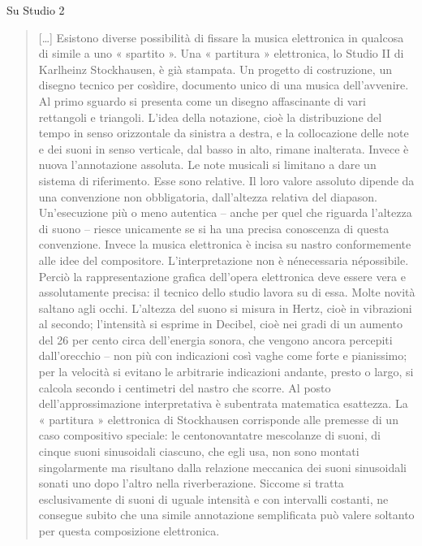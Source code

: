 Su Studio 2

\begin{quote}
	[\ldots] Esistono diverse possibilità di fissare la musica elettronica in qualcosa di simile a uno « spartito ». Una « partitura » elettronica, lo Studio II di Karlheinz Stockhausen, è già stampata. Un progetto di costruzione, un disegno tecnico per cosìdire, documento unico di una musica dell’avvenire. Al primo sguardo si presenta come un disegno affascinante di vari rettangoli e triangoli.
	L’idea della notazione, cioè la distribuzione del tempo in senso orizzontale da sinistra a destra, e la collocazione delle note e dei suoni in senso verticale, dal basso in alto, rimane inalterata. Invece è nuova l’annotazione assoluta. Le note musicali si limitano a dare un sistema di riferimento. Esse sono relative. Il loro valore assoluto dipende da una convenzione non obbligatoria, dall’altezza relativa del diapason. Un’esecuzione più o meno autentica – anche per quel che riguarda l’altezza di suono – riesce unicamente se si ha una precisa conoscenza di questa convenzione. Invece la musica elettronica è incisa su nastro conformemente alle idee del compositore. L’interpretazione non è nénecessaria népossibile. Perciò la rappresentazione grafica dell’opera elettronica deve essere vera e assolutamente precisa: il tecnico dello studio lavora su di essa. Molte novità saltano agli occhi. L’altezza del suono si misura in Hertz, cioè in vibrazioni al secondo; l’intensità si esprime in Decibel, cioè nei gradi di un aumento del 26 per cento circa dell’energia sonora, che vengono ancora percepiti dall’orecchio – non più con indicazioni così vaghe come forte e pianissimo; per la velocità si evitano le arbitrarie indicazioni andante, presto o largo, si calcola secondo i centimetri del nastro che scorre. Al posto dell’approssimazione interpretativa è subentrata matematica esattezza. La « partitura » elettronica di Stockhausen corrisponde alle premesse di un caso compositivo speciale: le centonovantatre mescolanze di suoni, di cinque suoni sinusoidali ciascuno, che egli usa, non sono montati singolarmente ma risultano dalla relazione meccanica dei suoni sinusoidali sonati uno dopo l’altro nella riverberazione. Siccome si tratta esclusivamente di suoni di uguale intensità e con intervalli costanti, ne consegue subito che una simile annotazione semplificata può valere soltanto per questa composizione elettronica.


\end{quote}
